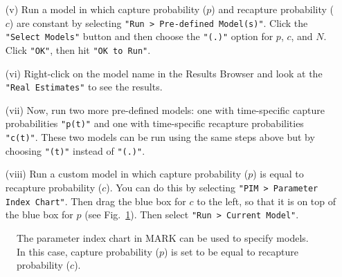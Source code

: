 \documentclass[12pt]{article}
\begin{document}
\begin{enumerate}
  \item[(v)] Run a model in which capture probability ($p$) and
    recapture probability ($c$) are constant by selecting
    \verb+"Run > Pre-defined Model(s)"+. Click the
    \verb+"Select Models"+ button and then choose the \verb+"(.)"+ option for $p$,
    $c$, and $N$. Click \verb+"OK"+, then hit \verb+"OK to Run"+.
  \item[(vi)] Right-click on the model name in the Results Browser
    and look at the \verb+"Real Estimates"+ to see the results.
  \item[(vii)]	Now, run two more pre-defined models: one with
    time-specific capture probabilities \verb+"p(t)"+ and one with
    time-specific recapture probabilities \verb+"c(t)"+. These two models can
    be run using the same steps above but by choosing \verb+"(t)"+ instead
    of \verb+"(.)"+.
  \item[(viii)] Run a custom model in which capture probability ($p$)
    is equal to recapture probability ($c$). You can do this by
    selecting \verb+"PIM > Parameter Index Chart"+. Then drag the blue
    box for $c$ to the left, so that it is on top of the blue box for $p$
    (see Fig.~\ref{fig:pim}). Then select \verb+"Run > Current Model"+.
\end{enumerate}

\clearpage

\begin{figure}[h!]
  \centering
  \caption{\small The parameter index chart in MARK can be
    used to specify models. In this case, capture probability ($p$) is
    set to be equal to recapture probability ($c$).}
  \label{fig:pim}
\end{figure}

\vspace{1cm}
\end{document}
